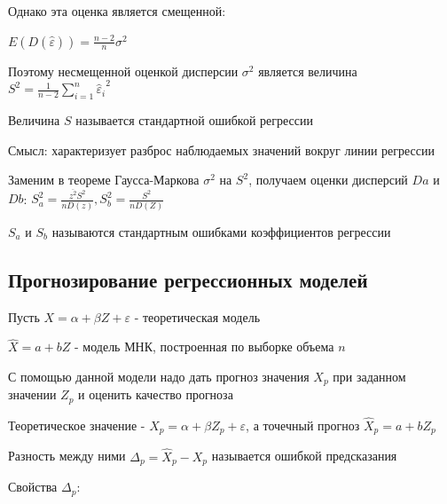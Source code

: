 \documentclass[12pt]{article}
\begin{document}
Однако эта оценка является смещенной:

$E(D(\hat \varepsilon)) = \frac{n - 2}{n} \sigma^2$

Поэтому несмещенной оценкой дисперсии $\sigma^2$ является величина $S^2 = \frac{1}{n - 2} \sum_{i = 1}^n {\hat \varepsilon_i}^2$

\Def Величина $S$ называется стандартной ошибкой регрессии

Смысл: характеризует разброс наблюдаемых значений вокруг линии регрессии

\Nota Заменим в теореме Гаусса-Маркова $\sigma^2$ на $S^2$, получаем оценки дисперсий $Da$ и $Db$: $S_a^2 = \frac{\overline{z^2} S^2}{n D(z)}, S^2_b = \frac{S^2}{n D(Z)}$

\Def $S_a$ и $S_b$ называются стандартным ошибками коэффициентов регрессии

\subsection{Прогнозирование регрессионных моделей}

Пусть $X = \alpha + \beta Z + \varepsilon$ - теоретическая модель

$\hat X = a + b Z$ - модель МНК, построенная по выборке объема $n$

С помощью данной модели надо дать прогноз значения $X_p$ при заданном значении $Z_p$ и оценить качество прогноза 

Теоретическое значение - $X_p = \alpha + \beta Z_p + \varepsilon$, а точечный прогноз $\hat X_p = a + b Z_p$

Разность между ними $\Delta_p = \hat X_p - X_p$ называется ошибкой предсказания

Свойства $\Delta_p$:
\end{document}
